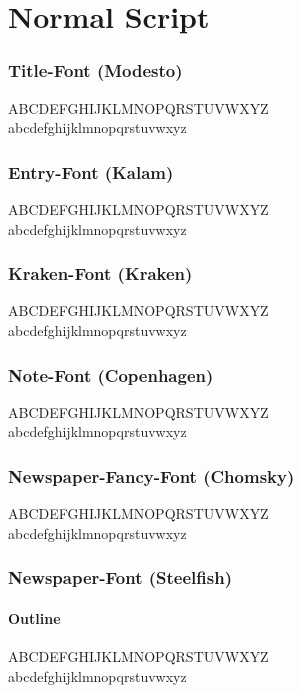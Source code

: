 \documentclass[letterpaper,openany,twoside,twocolumn]{book}
\begin{document}
	\chapter{Normal Script}
	
	\subsection{Title-Font (Modesto)}
	{\titlefont ABCDEFGHIJKLMNOPQRSTUVWXYZ}\\
	{\titlefont abcdefghijklmnopqrstuvwxyz}
	
	\subsection{Entry-Font (Kalam)}
	{\entryfont ABCDEFGHIJKLMNOPQRSTUVWXYZ}\\
	{\entryfont abcdefghijklmnopqrstuvwxyz}
	
	\subsection{Kraken-Font (Kraken)}
	{\krakenfont ABCDEFGHIJKLMNOPQRSTUVWXYZ}\\
	{\krakenfont abcdefghijklmnopqrstuvwxyz}
	
	\subsection{Note-Font (Copenhagen)}
	{\notefont ABCDEFGHIJKLMNOPQRSTUVWXYZ}\\
	{\notefont abcdefghijklmnopqrstuvwxyz}
	
	\subsection{Newspaper-Fancy-Font (Chomsky)}
	{\newspaperFancyHeaderFont ABCDEFGHIJKLMNOPQRSTUVWXYZ}\\
	{\newspaperFancyHeaderFont abcdefghijklmnopqrstuvwxyz}
	
	\subsection{Newspaper-Font (Steelfish)}
	\subsubsection{Outline}
	{\newspaperHeaderOutlineFont ABCDEFGHIJKLMNOPQRSTUVWXYZ}\\
	{\newspaperHeaderOutlineFont abcdefghijklmnopqrstuvwxyz}
\end{document}

